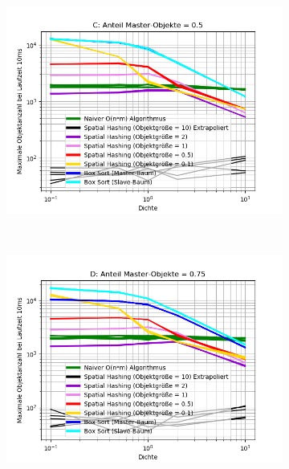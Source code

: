\begin{figure}
\begin{subfigure}[t]{0.55\textwidth}
		\label{fig:asymComparison-B}
	\end{subfigure}
~
	\begin{subfigure}[t]{0.55\textwidth}
		\centering
		\includegraphics[width=1\textwidth]{./res/asymComparison-C.png}

		\label{fig:asymComparison-C}
	\end{subfigure}
~
	\begin{subfigure}[t]{0.55\textwidth}
		\centering
		\includegraphics[width=1\textwidth]{./res/asymComparison-D.png}


\end{subfigure}
\end{figure}
